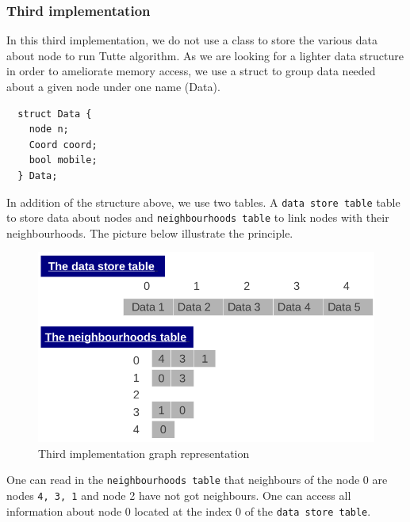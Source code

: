 \subsubsection{Third implementation}
In this third implementation, we do not use a class to store the
various data about node to run Tutte algorithm. 
As we are looking for a lighter data structure in order to ameliorate 
memory access, we use a \textsf{struct} to group data needed about a given node
under one name (\textsf{Data}). 
\begin{lstlisting}
  struct Data {
    node n;
    Coord coord;
    bool mobile;
  } Data;
\end{lstlisting}
In addition of the structure above, we use two tables. A \texttt{data store table} table to store data about nodes and \texttt{neighbourhoods table} to link nodes with their neighbourhoods. The picture below illustrate the principle.
\begin {figure}[H]
  \centering
  \includegraphics[scale=0.5]{img/struct3.png}
  \caption{Third implementation graph representation}
  \label{struct3}
\end {figure}
\noindent One can read in the \texttt{neighbourhoods table} that neighbours of the node 0 are nodes \texttt{4, 3,  1} and node 2 have not got neighbours. One can access all information about node 0 located at the index 0 of the \texttt{data store table}.  
